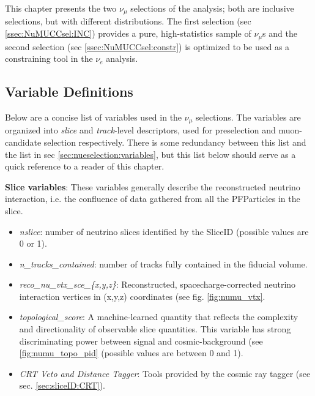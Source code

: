 \label{sec:NuMUCCsel}

\par This chapter presents the two $\nu_{\mu}$ selections of the analysis; both are inclusive selections, but with different distributions. The first selection (sec \ref{ssec:NuMUCCsel:INC}) provides a pure, high-statistics sample of $\nu_{\mu}$s and the second selection (sec \ref{ssec:NuMUCCsel:constr}) is optimized to be used as a constraining tool in the $\nu_e$ analysis. 

\subsection{Variable Definitions}
\label{ssec:NuMUCCsel:sel:vars}

\par Below are a concise list of variables used in the $\nu_{\mu}$ selections. The variables are organized into \textit{slice} and \textit{track}-level descriptors, used for preselection and muon-candidate selection respectively. There is some redundancy between this list and the list in sec \ref{sec:nueselection:variables}, but this list below should serve as a quick reference to a reader of this chapter.

\par \noindent \textbf{Slice variables}: These variables generally describe the reconstructed neutrino interaction, i.e. the confluence of data gathered from all the PFParticles in the slice.
\begin{itemize}
    \item \emph{nslice}: number of neutrino slices identified by the SliceID (possible values are 0 or 1).
    \item \emph{n\_tracks\_contained}: number of tracks fully contained in the fiducial volume.
    \item \emph{reco\_nu\_vtx\_sce\_\{x,y,z\}}: Reconstructed, spacecharge-corrected neutrino interaction vertices in (x,y,z) coordinates (see fig. \ref{fig:numu_vtx}.
    \item \emph{topological\_score}: A machine-learned quantity that reflects the complexity and directionality of observable slice quantities. This variable has strong discriminating power between signal and cosmic-background (see \ref{fig:numu_topo_pid} (possible values are between 0 and 1).
    \item \emph{CRT Veto and Distance Tagger}: Tools provided by the cosmic ray tagger (see sec. \ref{sec:sliceID:CRT}).
\end{itemize}

